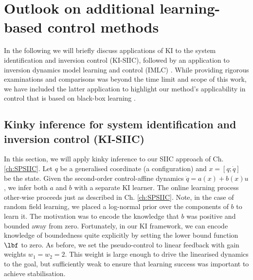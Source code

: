 \section{Outlook on additional learning-based control methods}
In the following we will briefly discuss applications of KI to the system identification and inversion control (KI-SIIC), followed by an application to inversion dynamics model learning and control (IMLC)  \cite{Tuongmodellearningsurvey2011}. While providing rigorous examinations and comparisons was beyond the time limit and scope of this work, we have included the latter application to highlight our method's applicability in control that is based on black-box learning \cite{Ljungperspectives:2010}.

\subsection{Kinky inference for system identification and inversion control (KI-SIIC)}
In this section, we will apply kinky inference to our SIIC approach of Ch. \ref{ch:SPSIIC}. Let $q$ be a generalised coordinate (a configuration) and $x = [q; \dot q]$ be the state.  
Given the second-order control-affine dynamics $\ddot q = a(x) + b(x) u$, we infer both $a$ and $b$ with a separate KI learner. The online learning process other-wise proceeds just as described in Ch. \ref{ch:SPSIIC}. Note, in the case of random field learning, we placed a log-normal prior over the components of $b$ to learn it. The motivation was to encode the knowledge that $b$ was positive and bounded away from zero. Fortunately, in our KI framework, we can encode knowledge of boundedness quite explicitly by setting the lower bound function $\lbf$ to zero. As before, we set the pseudo-control to linear feedback with gain weights $w_1=w_2=2$. This weight is large enough to drive the linearised dynamics to the goal, but sufficiently weak to ensure that learning success was important to achieve stabilisation.

